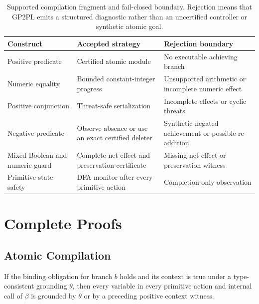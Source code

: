 \begin{table}[htbp]
\centering
\small
\setlength{\tabcolsep}{2pt}
\begin{tabular}{@{}
>{\raggedright\arraybackslash}p{}
>{\raggedright\arraybackslash}p{}
>{\raggedright\arraybackslash}p{}@{}}
\toprule
Construct & Accepted strategy & Rejection boundary \\
\midrule
Positive predicate & Certified atomic module & No executable achieving branch \\
Numeric equality & Bounded constant-integer progress & Unsupported arithmetic or
incomplete numeric effect \\
Positive conjunction & Threat-safe serialization & Incomplete effects or cyclic
threats \\
Negative predicate & Observe absence or use an exact certified deleter & Synthetic
negated achievement or possible re-addition \\
Mixed Boolean and numeric guard & Complete net-effect and preservation certificate &
Missing net-effect or preservation witness \\
Primitive-state safety & DFA monitor after every primitive action & Completion-only
observation \\
\bottomrule
\end{tabular}
\caption{Supported compilation fragment and fail-closed boundary. Rejection
means that GP2PL emits a structured diagnostic rather than an uncertified
controller or synthetic atomic goal.}
\label{tab:supported-fragment}
\end{table}

\section{Complete Proofs}
\label{app:proofs}

\subsection{Atomic Compilation}

\begin{lemma}
If the binding obligation for branch $b$ holds and its context is true under a
type-consistent grounding $\theta$, then every variable in every primitive
action and internal call of $\beta$ is grounded by $\theta$ or by a preceding
positive context witness.
\end{lemma}

